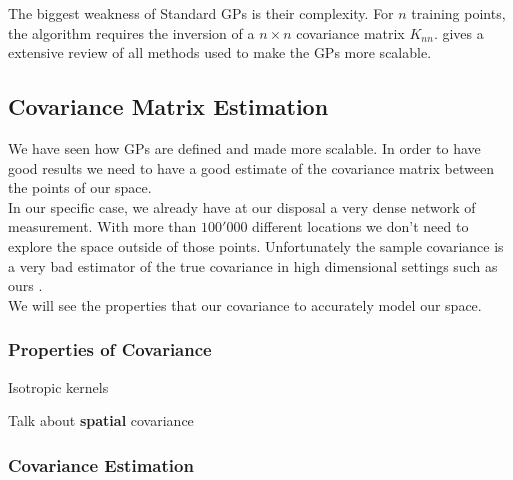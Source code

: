 \documentclass[12pt,twoside]{report}
\begin{document}
The biggest weakness of Standard GPs is their complexity. For $n$ training points, the algorithm requires the inversion of a $n \times n$ covariance matrix $K_{nn}$. \citet{liu_when_2018} gives a extensive review of all methods used to make the GPs more scalable. 




\subsection{Covariance Matrix Estimation} \label{sec:cov_est}

We have seen how GPs are defined and made more scalable. In order to have good results we need to have a good estimate of the covariance matrix between the points of our space. \\




In our specific case, we already have at our disposal a very dense network of measurement. With more than $100'000$ different locations we don't need to explore the space outside of those points. Unfortunately the sample covariance is a very bad estimator of the true covariance in high dimensional settings such as ours \citep{pourahmadi_covariance_2011}. \\


We will see the properties that our covariance to accurately model our space. 


\subsubsection{Properties of Covariance}

Isotropic kernels

Talk about \textbf{spatial} covariance \cite{cressie_statistics_1991}



\subsubsection{Covariance Estimation}

\paragraph{}
\end{document}
